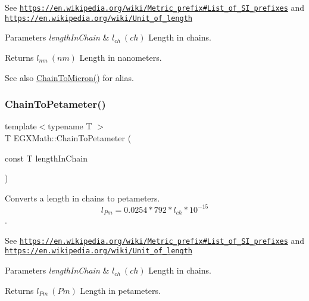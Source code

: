 See \href{https://en.wikipedia.org/wiki/Metric_prefix#List_of_SI_prefixes}{\tt https\+://en.\+wikipedia.\+org/wiki/\+Metric\+\_\+prefix\#\+List\+\_\+of\+\_\+\+S\+I\+\_\+prefixes} and \href{https://en.wikipedia.org/wiki/Unit_of_length}{\tt https\+://en.\+wikipedia.\+org/wiki/\+Unit\+\_\+of\+\_\+length} 
\begin{DoxyParams}{Parameters}
{\em length\+In\+Chain} & $ l_{ch}\ (ch)$ Length in chains. \\
\hline
\end{DoxyParams}
\begin{DoxyReturn}{Returns}
$ l_{nm}\ (nm)$ Length in nanometers. 
\end{DoxyReturn}
\begin{DoxySeeAlso}{See also}
\mbox{\hyperlink{group___e_g_x_math-_conversions-_length_conversions-_imperial-_chain-_non-_s_i_ga9efe9ceb0ab30639026cbb4158bb0148}{Chain\+To\+Micron()}} for alias. 
\end{DoxySeeAlso}
\mbox{\label{group___e_g_x_math-_conversions-_length_conversions-_imperial-_chain-_s_i_ga4a40c43d2437af26f04a678f438451ce}} 
\subsubsection{\texorpdfstring{Chain\+To\+Petameter()}{ChainToPetameter()}}
{\footnotesize\ttfamily template$<$typename T $>$ \\
T E\+G\+X\+Math\+::\+Chain\+To\+Petameter (\begin{DoxyParamCaption}\item[{const T}]{length\+In\+Chain }\end{DoxyParamCaption})}



Converts a length in chains to petameters. \[ l_{Pm}=0.0254 * 792 * l_{ch} * 10^{-15} \]. 

See \href{https://en.wikipedia.org/wiki/Metric_prefix#List_of_SI_prefixes}{\tt https\+://en.\+wikipedia.\+org/wiki/\+Metric\+\_\+prefix\#\+List\+\_\+of\+\_\+\+S\+I\+\_\+prefixes} and \href{https://en.wikipedia.org/wiki/Unit_of_length}{\tt https\+://en.\+wikipedia.\+org/wiki/\+Unit\+\_\+of\+\_\+length} 
\begin{DoxyParams}{Parameters}
{\em length\+In\+Chain} & $ l_{ch}\ (ch)$ Length in chains. \\
\hline
\end{DoxyParams}
\begin{DoxyReturn}{Returns}
$ l_{Pm}\ (Pm)$ Length in petameters. 
\end{DoxyReturn}
\mbox{\label{group___e_g_x_math-_conversions-_length_conversions-_imperial-_chain-_s_i_ga27f06f3f63727a16e02afaf8f01f4b45}} 
